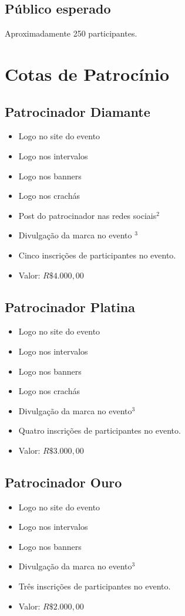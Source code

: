 \documentclass[12pt]{article}
\begin{document}
\subsection{Público esperado}

Aproximadamente 250 participantes.

\section{Cotas de Patrocínio}
\subsection{Patrocinador Diamante}
  \begin{itemize}[label={}]
  \setlength\itemsep{0.0em}
        \item Logo no site do evento
        \item Logo nos intervalos
        \item Logo nos banners
        \item Logo nos crachás
        \item Post do patrocinador nas redes sociais$^2$
        \item Divulgação da marca no evento $^3$
        \item Cinco inscrições de participantes no evento.
        \item Valor: $R\$ 4.000,00$
  \end{itemize}
\subsection{Patrocinador Platina}
  \begin{itemize}[label={}]
  \setlength\itemsep{0.0em}
        \item Logo no site do evento
        \item Logo nos intervalos
        \item Logo nos banners
        \item Logo nos crachás
        \item Divulgação da marca no evento$^3$
        \item Quatro inscrições de participantes no evento.
        \item Valor: $R\$ 3.000,00$
  \end{itemize}
\subsection{Patrocinador Ouro}
  \begin{itemize}[label={}]
  \setlength\itemsep{0.0em}
        \item Logo no site do evento
        \item Logo nos intervalos
        \item Logo nos banners
        \item Divulgação da marca no evento$^3$
        \item Três inscrições de participantes no evento.
        \item Valor: $R\$ 2.000,00$
  \end{itemize}
\end{document}
